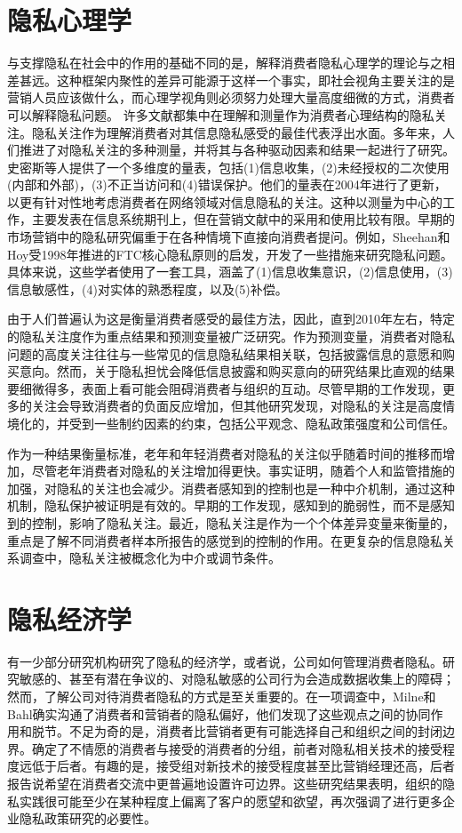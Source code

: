 \documentclass[degree=project,degree-type=project,cjk-font=windows]{thuthesis}
\begin{document}
\section{隐私心理学}
与支撑隐私在社会中的作用的基础不同的是，解释消费者隐私心理学的理论与之相差甚远。这种框架内聚性的差异可能源于这样一个事实，即社会视角主要关注的是营销人员应该做什么，而心理学视角则必须努力处理大量高度细微的方式，消费者可以解释隐私问题。
许多文献都集中在理解和测量作为消费者心理结构的隐私关注。隐私关注作为理解消费者对其信息隐私感受的最佳代表浮出水面。多年来，人们推进了对隐私关注的多种测量，并将其与各种驱动因素和结果一起进行了研究。史密斯等人提供了一个多维度的量表，包括(1)信息收集，(2)未经授权的二次使用(内部和外部)，(3)不正当访问和(4)错误保护。他们的量表在2004年进行了更新，以更有针对性地考虑消费者在网络领域对信息隐私的关注。这种以测量为中心的工作，主要发表在信息系统期刊上，但在营销文献中的采用和使用比较有限。早期的市场营销中的隐私研究偏重于在各种情境下直接向消费者提问。例如，Sheehan和Hoy受1998年推进的FTC核心隐私原则的启发，开发了一些措施来研究隐私问题。具体来说，这些学者使用了一套工具，涵盖了(1)信息收集意识，(2)信息使用，(3)信息敏感性，(4)对实体的熟悉程度，以及(5)补偿。

由于人们普遍认为这是衡量消费者感受的最佳方法，因此，直到2010年左右，特定的隐私关注度作为重点结果和预测变量被广泛研究。作为预测变量，消费者对隐私问题的高度关注往往与一些常见的信息隐私结果相关联，包括披露信息的意愿和购买意向。然而，关于隐私担忧会降低信息披露和购买意向的研究结果比直观的结果要细微得多，表面上看可能会阻碍消费者与组织的互动。尽管早期的工作发现，更多的关注会导致消费者的负面反应增加，但其他研究发现，对隐私的关注是高度情境化的，并受到一些制约因素的约束，包括公平观念、隐私政策强度和公司信任。

作为一种结果衡量标准，老年和年轻消费者对隐私的关注似乎随着时间的推移而增加，尽管老年消费者对隐私的关注增加得更快。事实证明，随着个人和监管措施的加强，对隐私的关注也会减少。消费者感知到的控制也是一种中介机制，通过这种机制，隐私保护被证明是有效的。早期的工作发现，感知到的脆弱性，而不是感知到的控制，影响了隐私关注。最近，隐私关注是作为一个个体差异变量来衡量的，重点是了解不同消费者样本所报告的感觉到的控制的作用。在更复杂的信息隐私关系调查中，隐私关注被概念化为中介或调节条件。

\section{隐私经济学}

有一少部分研究机构研究了隐私的经济学，或者说，公司如何管理消费者隐私。研究敏感的、甚至有潜在争议的、对隐私敏感的公司行为会造成数据收集上的障碍；然而，了解公司对待消费者隐私的方式是至关重要的。在一项调查中，Milne和Bahl确实沟通了消费者和营销者的隐私偏好，他们发现了这些观点之间的协同作用和脱节。不足为奇的是，消费者比营销者更有可能选择自己和组织之间的封闭边界。确定了不情愿的消费者与接受的消费者的分组，前者对隐私相关技术的接受程度远低于后者。有趣的是，接受组对新技术的接受程度甚至比营销经理还高，后者报告说希望在消费者交流中更普遍地设置许可边界。这些研究结果表明，组织的隐私实践很可能至少在某种程度上偏离了客户的愿望和欲望，再次强调了进行更多企业隐私政策研究的必要性。
\end{document}
